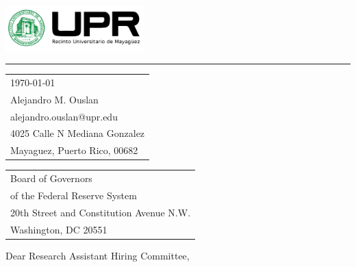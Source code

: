 \documentclass{article}
\begin{document}

\includegraphics[width=0.4\textwidth]{logo.png} %

\vspace{-1em} %

\rule{\linewidth}{1pt} %

\bigskip\bigskip %


\hfill
\begin{tabular}{l @{}}
\hfill \today \bigskip\\ %
\hfill Alejandro M. Ouslan \\
\hfill alejandro.ouslan@upr.edu \\
\hfill 4025 Calle N Mediana Gonzalez\\
\hfill Mayaguez, Puerto Rico, 00682 \\
\end{tabular}

\bigskip %


\begin{tabular}{@{} l}
Board of Governors \\
of the Federal Reserve System \\
20th Street and Constitution Avenue N.W. \\
Washington, DC 20551
\end{tabular}


\bigskip %

Dear Research Assistant Hiring Committee,

\bigskip %
\end{document}
